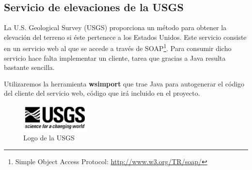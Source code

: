 \subsection*{Servicio de elevaciones de la USGS}

La U.S. Geological Survey (USGS) proporciona un método para obtener la elevación
del terreno si éste pertenece a los Estados Unidos. Este servicio consiste en un
servicio web al que se accede a través de SOAP\footnote{Simple Object Access
Protocol: \url{http://www.w3.org/TR/soap/}}. Para consumir dicho servicio hace
falta implementar un cliente, tarea que gracias a Java resulta bastante
sencilla.

Utilizaremos la herramienta {\bf wsimport} que trae Java para autogenerar el
código del cliente del servicio web, código que irá incluido en el proyecto.

\begin{figure}[H]
 \centering
 \includegraphics[width=35mm]{figuras/cap4/usgs.png}
 \caption{Logo de la USGS}
\end{figure}

